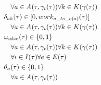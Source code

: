 \begin{alignat}{2}
	& \quad \forall a \in A_{}(\tau, \gamma_{t}(\tau)) \forall k \in K(\gamma_{}(\tau)) \\
	& \delta_{ak}(\tau) \in [0, work_{a\_to\_o(a)}(\tau) ] \notag\\
	& \quad \forall a \in A_{}(\tau, \gamma_{t}(\tau)) \forall k \in K(\gamma_{}(\tau))                                               \\
	& \omega_{akie}(\tau) \in \{0 , 1\}                                                                                                                              \\ 
	& \quad \forall a \in A_{}(\tau, \gamma_{t}(\tau)) \forall k \in K(\gamma_{}(\tau)) \notag\\
	& \quad \forall i \in I(\tau) \forall e \in E(\tau) \notag                               \\
	& \theta_{a}(\tau) \in \{0, 1\} \notag\\
	& \quad \forall a \in A_{}(\tau, \gamma_{t}(\tau))                                                                                
\end{alignat}
